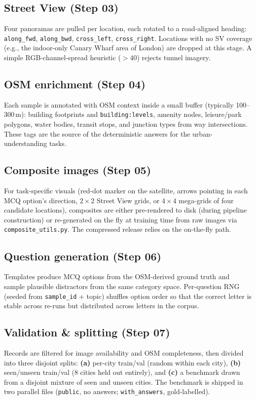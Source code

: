 \documentclass[11pt,a4paper]{article}
\begin{document}
\subsection{Street View (Step 03)}
Four panoramas are pulled per location, each rotated to a road-aligned
heading: \texttt{along\_fwd}, \texttt{along\_bwd}, \texttt{cross\_left},
\texttt{cross\_right}. Locations with no SV coverage (e.g., the
indoor-only Canary Wharf area of London) are dropped at this stage.
A simple RGB-channel-spread heuristic ($>40$) rejects tunnel imagery.

\subsection{OSM enrichment (Step 04)}
Each sample is annotated with OSM context inside a small buffer
(typically 100--300\,m): building footprints and \texttt{building:levels},
amenity nodes, leisure/park polygons, water bodies, transit stops,
and junction types from way intersections. These tags are the source
of the deterministic answers for the urban-understanding tasks.

\subsection{Composite images (Step 05)}
For task-specific visuals (red-dot marker on the satellite, arrows
pointing in each MCQ option's direction, $2\times2$ Street View grids,
or $4\times4$ mega-grids of four candidate locations), composites are
either pre-rendered to disk (during pipeline construction) or
re-generated on the fly at training time from raw images via
\texttt{composite\_utils.py}. The compressed release relies on the
on-the-fly path.

\subsection{Question generation (Step 06)}
Templates produce MCQ options from the OSM-derived ground truth and
sample plausible distractors from the same category space.
Per-question RNG (seeded from \texttt{sample\_id} + topic) shuffles
option order so that the correct letter is stable across re-runs
but distributed across letters in the corpus.

\subsection{Validation \& splitting (Step 07)}
Records are filtered for image availability and OSM completeness, then
divided into three disjoint splits:
\textbf{(a)} per-city train/val (random within each city),
\textbf{(b)} seen/unseen train/val (8 cities held out entirely), and
\textbf{(c)} a benchmark drawn from a disjoint mixture of seen and
unseen cities. The benchmark is shipped in two parallel files
(\texttt{public}, no answers; \texttt{with\_answers}, gold-labelled).
\end{document}
